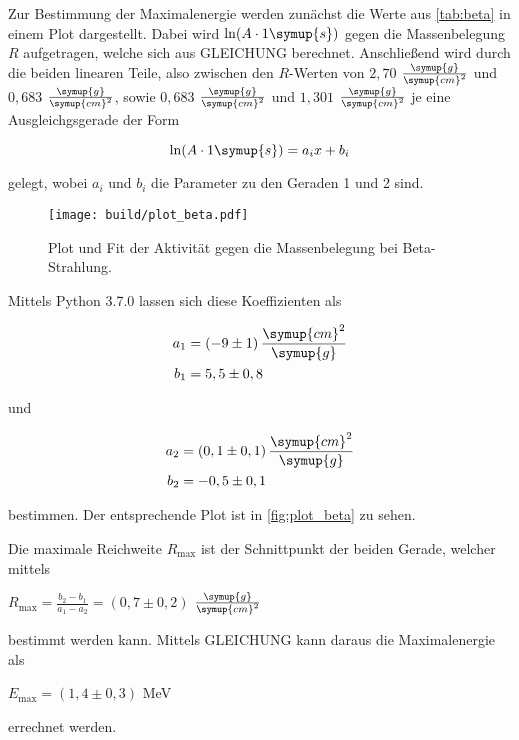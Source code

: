 Zur Bestimmung der Maximalenergie werden zunächst die Werte aus \autoref{tab:beta} in einem Plot dargestellt.
Dabei wird $\ln(A \cdot 1 \symup{s})$ gegen die Massenbelegung $R$ aufgetragen, welche sich aus GLEICHUNG berechnet.
Anschließend wird durch die beiden linearen Teile,
also zwischen den $R$-Werten von $2,70$ $\frac{\symup{g}}{\symup{cm}^2}$ und $0,683$ $\frac{\symup{g}}{\symup{cm}^2}$, 
sowie $0,683$ $\frac{\symup{g}}{\symup{cm}^2}$ und $1,301$ $\frac{\symup{g}}{\symup{cm}^2}$ je eine Ausgleichgsgerade der Form

\begin{equation}
    \ln(A \cdot 1 \symup{s}) = a_i x + b_i
\end{equation}

gelegt, wobei $a_i$ und $b_i$ die Parameter zu den Geraden 1 und 2 sind.



\begin{figure}
    \centering
    \texttt{[image: build/plot\_beta.pdf]}
    \caption{Plot und Fit der Aktivität gegen die Massenbelegung bei Beta-Strahlung.}
    \label{fig:plot_beta}
\end{figure}

Mittels Python 3.7.0 lassen sich diese Koeffizienten als

\begin{align*}
    a_1 &= (-9 \pm 1) \, \frac{\symup{cm}^2}{\symup{g}}\\
    b_1 &= 5,5 \pm 0,8
\end{align*}

und

\begin{align*}
    a_2 &= (0,1 \pm 0,1) \, \frac{\symup{cm}^2}{\symup{g}}\\
    b_2 &= -0,5 \pm 0,1
\end{align*}

bestimmen. Der entsprechende Plot ist in \autoref{fig:plot_beta} zu sehen.

Die maximale Reichweite $R_\text{max}$ ist der Schnittpunkt der beiden Gerade, welcher mittels

\begin{center}
    $R_\text{max} = \frac{b_2 - b_1}{a_1 - a_2} = (0,7 \pm 0,2)$ $\frac{\symup{g}}{\symup{cm}^2}$
\end{center}

bestimmt werden kann. Mittels GLEICHUNG kann daraus die Maximalenergie als

\begin{center}
    $E_\text{max} = (1,4 \pm 0,3)$ MeV
\end{center}

errechnet werden.